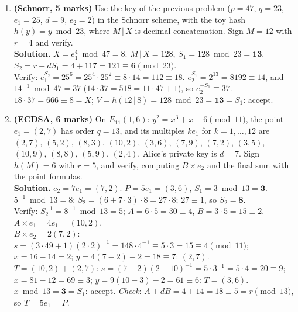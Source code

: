 \begin{enumerate}[leftmargin=1.6em,itemsep=4pt]
  \item \textbf{(Schnorr, 5 marks)} Use the key of the previous problem ($p = 47$, $q = 23$, $e_1 = 25$, $d = 9$, $e_2 = 2$) in the Schnorr scheme, with the toy hash $h(y) = y \bmod 23$, where $M \,|\, X$ is decimal concatenation. Sign $M = 12$ with $r = 4$ and verify.\\
  \textbf{Solution.} $X = e_1^4 \bmod 47 = 8$. $M \,|\, X = 128$, $S_1 = 128 \bmod 23 = \mathbf{13}$. $S_2 = r + dS_1 = 4 + 117 = 121 \equiv \mathbf{6} \pmod{23}$.\\
  Verify: $e_1^{S_2} = 25^6 = 25^4 \cdot 25^2 \equiv 8 \cdot 14 = 112 \equiv 18$. $e_2^{S_1} = 2^{13} = 8192 \equiv 14$, and $14^{-1} \bmod 47 = 37$ ($14 \cdot 37 = 518 = 11 \cdot 47 + 1$), so $e_2^{-S_1} \equiv 37$. $18 \cdot 37 = 666 \equiv 8 = X$; $V = h(12 \,|\, 8) = 128 \bmod 23 = \mathbf{13} = S_1$: accept.

  \item \textbf{(ECDSA, 6 marks)} On $E_{11}(1, 6)$: $y^2 = x^3 + x + 6 \pmod{11}$, the point $e_1 = (2, 7)$ has order $q = 13$, and its multiples $k e_1$ for $k = 1, \dots, 12$ are $(2,7)$, $(5,2)$, $(8,3)$, $(10,2)$, $(3,6)$, $(7,9)$, $(7,2)$, $(3,5)$, $(10,9)$, $(8,8)$, $(5,9)$, $(2,4)$. Alice's private key is $d = 7$. Sign $h(M) = 6$ with $r = 5$, and verify, computing $B \times e_2$ and the final sum with the point formulas.\\
  \textbf{Solution.} $e_2 = 7 e_1 = (7, 2)$. $P = 5 e_1 = (3, 6)$, $S_1 = 3 \bmod 13 = \mathbf{3}$. $5^{-1} \bmod 13 = 8$; $S_2 = (6 + 7 \cdot 3) \cdot 8 = 27 \cdot 8$; $27 \equiv 1$, so $S_2 = \mathbf{8}$.\\
  Verify: $S_2^{-1} = 8^{-1} \bmod 13 = 5$; $A = 6 \cdot 5 = 30 \equiv 4$, $B = 3 \cdot 5 = 15 \equiv 2$. $A \times e_1 = 4e_1 = (10, 2)$.\\
  $B \times e_2 = 2(7, 2)$: $s = (3 \cdot 49 + 1)(2 \cdot 2)^{-1} = 148 \cdot 4^{-1} \equiv 5 \cdot 3 = 15 \equiv 4 \pmod{11}$; $x = 16 - 14 = 2$; $y = 4(7 - 2) - 2 = 18 \equiv 7$: $(2, 7)$.\\
  $T = (10, 2) + (2, 7)$: $s = (7 - 2)(2 - 10)^{-1} = 5 \cdot 3^{-1} = 5 \cdot 4 = 20 \equiv 9$; $x = 81 - 12 = 69 \equiv 3$; $y = 9(10 - 3) - 2 = 61 \equiv 6$: $T = (3, 6)$.\\
  $x \bmod 13 = \mathbf{3} = S_1$: accept. \emph{Check}: $A + dB = 4 + 14 = 18 \equiv 5 = r \pmod{13}$, so $T = 5e_1 = P$.


\end{enumerate}
